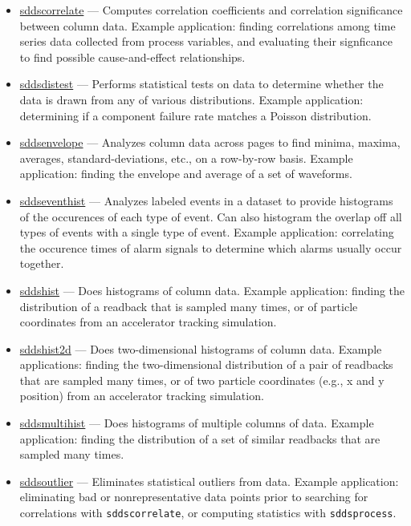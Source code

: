 \documentclass[11pt]{article}
\newcommand{\progref}[1]{\hyperref{#1}{{\tt #1} (}{)}{#1}}
\begin{document}
\begin{itemize}

\item \progref{sddscorrelate} --- Computes correlation coefficients and
correlation significance between column data.  Example application: finding correlations among time series data
collected from process variables, and evaluating their signficance to find possible cause-and-effect relationships.

\item \progref{sddsdistest} --- Performs statistical tests on data to
determine whether the data is drawn from any of various distributions.
Example application: determining if a component failure rate matches a
Poisson distribution.

\item \progref{sddsenvelope} --- Analyzes column data across pages to find
minima, maxima, averages, standard-deviations, etc., on a row-by-row basis.   Example application: finding 
the envelope and average of a set of waveforms.

\item \progref{sddseventhist} --- Analyzes labeled events in a dataset
to provide histograms of the occurences of each type of event.  Can
also histogram the overlap off all types of events with a single type
of event.  Example application: correlating the occurence times of
alarm signals to determine which alarms usually occur together.

\item \progref{sddshist} --- Does histograms of column data.  Example application: finding the distribution of a
readback that is sampled many times, or of particle coordinates from an accelerator tracking simulation.

\item \progref{sddshist2d} --- Does two-dimensional histograms of column data.  Example applications: finding the
two-dimensional distribution of a pair of readbacks that are sampled many times, or of two particle coordinates
(e.g., x and y position) from an accelerator tracking simulation.

\item \progref{sddsmultihist} --- Does histograms of multiple columns
of data.  Example application: finding the distribution of a set of
similar readbacks that are sampled many times.

\item \progref{sddsoutlier} --- Eliminates statistical outliers from data.  Example application: eliminating bad
or nonrepresentative data points prior to searching for correlations with \verb|sddscorrelate|, or computing
statistics with \verb|sddsprocess|.


\end{itemize}
\end{document}
